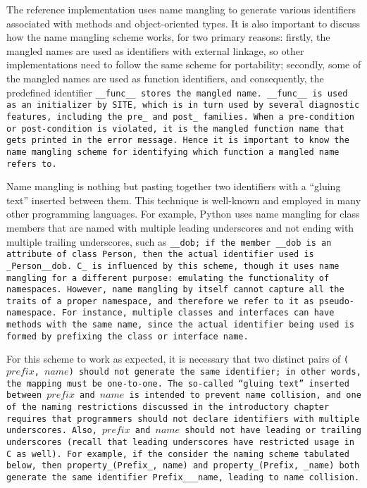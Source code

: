 The reference implementation uses name mangling to generate various
identifiers associated with methods and object-oriented types.
It is also important to discuss how the name
mangling scheme works, for two primary reasons:
firstly, the mangled names are used as identifiers with external linkage,
so other implementations need to follow the same scheme for portability;
secondly, some of the mangled names are used as function identifiers, and
consequently, the predefined identifier \tt{__func__} stores the mangled name.
\tt{__func__} is used as an initializer by \tt{SITE}, which is in turn used by
several diagnostic features, including the \tt{pre_} and \tt{post_} families.
When a pre-condition or post-condition is violated, it is the
mangled function name that gets printed in the error message.
Hence it is important to know the name mangling scheme
for identifying which function a mangled name refers to.

Name mangling is nothing but pasting together two
identifiers with a ``gluing text'' inserted between them.
This technique is well-known and employed in many other programming languages.
For example, Python uses name mangling for class members that are named with
multiple leading underscores and not ending with multiple trailing underscores,
such as \tt{__dob}; if the member \tt{__dob} is an attribute of class
\tt{Person}, then the actual identifier used is \tt{_Person__dob}.
C\_ is influenced by this scheme, though it uses name mangling
for a different purpose: emulating the functionality of namespaces.
However, name mangling by itself cannot capture all the traits of a
proper namespace, and therefore we refer to it as pseudo-namespace.
For instance, multiple classes and interfaces can have
methods with the same name, since the actual identifier
being used is formed by prefixing the class or interface name.

For this scheme to work as expected, it is necessary that two distinct pairs
of \tt{(}$prefix$\tt{,} $name$\tt{)} should not generate the same identifier;
in other words, the mapping must be one-to-one.
The so-called ``gluing text'' inserted between $prefix$ and $name$
is intended to prevent name collision, and one of the naming
restrictions discussed in the introductory chapter requires that
programmers should not declare identifiers with multiple underscores.
Also, $prefix$ and $name$ should not have leading or trailing underscores
(recall that leading underscores have restricted usage in C as well).
For example, if the consider the naming scheme tabulated below,
then \tt{property_(Prefix_, name)} and \tt{property_(Prefix, _name)} both
generate the same identifier \tt{Prefix___name}, leading to name collision.

